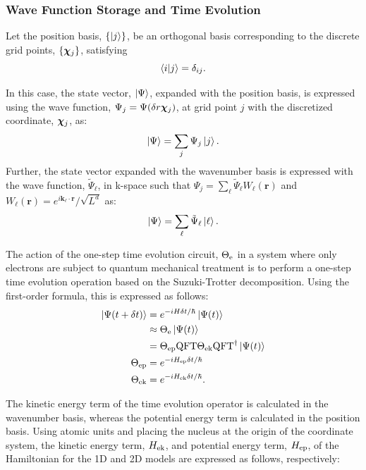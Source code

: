 \documentclass[jctc-draft.tex]{subfiles}
\begin{document}
\subsubsection{Wave Function Storage and Time Evolution}
Let the position basis, $\{\ket{j}\}$, be an orthogonal basis corresponding to the
discrete grid points, $\{\bm{\chi}_{j}\}$, satisfying
\begin{equation}
\braket{i|j}=\delta_{ij}.
\end{equation}

In this case, the state vector, $\ket{\Psi}$, expanded with the position basis, is
expressed using the wave function, $\Psi_j=\Psi(\delta r\bm{\chi}_{j})$, at grid point
$j$ with the discretized coordinate, $\bm{\chi}_{j}$, as:
\begin{equation}
\ket{\Psi} = \sum_{j}\Psi_j\ket{j}.
\end{equation}
Further, the state vector expanded with the wavenumber basis is expressed with
the wave function, $\tilde{\Psi}_{\ell}$, in k-space such that
$\Psi_j=\sum_{\ell} \tilde{\Psi}_{\ell}W_{\ell}(\bm{r})$ and
$W_{\ell}(\bm{r})=e^{i\bm{k}_{\ell}\cdot\bm{r}}/\sqrt{L^d}$ as:
\begin{equation}
\ket{\Psi} = \sum_{\ell}\tilde{\Psi}_{\ell}\ket{\ell}.
\end{equation}

The action of the one-step time evolution circuit, $\Theta_{\mathrm{e}}$ in a system where
only electrons are subject to quantum mechanical treatment is to perform a
one-step time evolution operation based on the Suzuki-Trotter decomposition.
Using the first-order formula, this is expressed as follows:
\begin{align}
\ket{\Psi(t+\delta t)}
 &= e^{-iH\delta t/\hbar}\ket{\Psi(t)} \notag \\
 &\approx \Theta_{\mathrm{e}} \ket{\Psi(t)} \label{eq:circuit-eval-theta-e}\\
 &= \Theta_{\mathrm{ep}}\mathrm{QFT}\Theta_{\mathrm{ek}}\mathrm{QFT}^\dagger\ket{\Psi(t)}\\
    \Theta_{\mathrm{ep}}&=e^{-iH_{\mathrm{ep}}\delta t/\hbar}\\
    \Theta_{\mathrm{ek}}&=e^{-iH_{\mathrm{ek}}\delta t/\hbar}.
\end{align}

The kinetic energy term of the time evolution operator is calculated in the
wavenumber basis, whereas the potential energy term is calculated in the
position basis. Using atomic units and placing the nucleus at the origin of the
coordinate system, the kinetic energy term, $H_{\mathrm{ek}}$, and potential energy term,
$H_{\mathrm{ep}}$, of the Hamiltonian for the 1D and 2D models are expressed as follows,
respectively:
\end{document}
